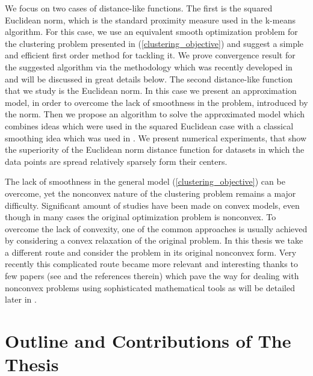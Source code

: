 We focus on two cases of distance-like functions. The first is the squared Euclidean norm, which is the standard proximity measure used in the k-means algorithm. For this case, we use an equivalent smooth optimization problem for the clustering problem presented in (\ref{clustering_objective}) and suggest a simple and efficient first order method for tackling it. We prove convergence result for the suggested algorithm via the methodology which was recently developed in \cite{BST2014} and will be discussed in great details below. 
The second distance-like function that we study is the Euclidean norm. In this case we present an approximation model, in order to overcome the lack of smoothness in the problem, introduced by the norm. Then we propose an algorithm to solve the approximated model which combines ideas which were used in the squared Euclidean case with a classical smoothing idea which was used in \cite{BS2015}. We present numerical experiments, that show the superiority of the Euclidean norm distance function for datasets in which the data points are spread relatively sparsely form their centers. \medskip

The lack of smoothness in the general model  (\ref{clustering_objective}) can be overcome, yet the nonconvex nature of the clustering problem remains a major difficulty. Significant amount of studies have been made on convex models, even though in many cases the original optimization problem is nonconvex. To overcome the lack of convexity, one of the common approaches is usually achieved by considering a convex relaxation of the original problem. In this thesis we take a different route and consider the problem in its original nonconvex form. Very recently this complicated route became more relevant and interesting thanks to few papers (see \cite{AB2009,ABS2013,BST2014} and the references therein) which pave the way for dealing with nonconvex problems using sophisticated mathematical tools as will be detailed later in .


\section{Outline and Contributions of The Thesis}

